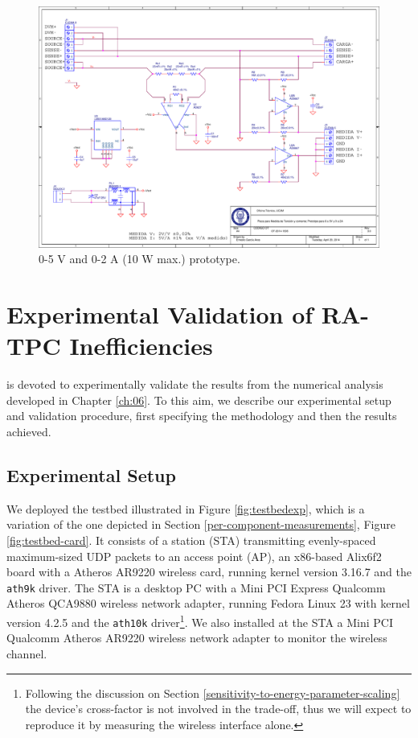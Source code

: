 \documentclass[twoside,nohyper]{tufte-book}
\newcommand{\restorewidth}{
  \restoregeometry
  \fancyhfoffset[RO]{{\marginparsep+\marginparwidth}}
}
\theoremstyle{definition}
\theoremstyle{definition}
\theoremstyle{definition}
\theoremstyle{remark}
\begin{document}
\begin{figure}

{\centering \includegraphics{img/03/schematic-v3} 

}

\caption[0-5 V and 0-2 A (10 W max.) prototype.]{0-5 V and 0-2 A (10 W max.) prototype.}\label{fig:schematicv3}
\end{figure}

\restorewidth

\chapter{Experimental Validation of RA-TPC
Inefficiencies}\label{experimental-validation-of-ra-tpc-inefficiencies}

 is devoted to experimentally validate the
results from the numerical analysis developed in Chapter \ref{ch:06}. To
this aim, we describe our experimental setup and validation procedure,
first specifying the methodology and then the results achieved.

\section{Experimental Setup}\label{experimental-setup}

We deployed the testbed illustrated in Figure \ref{fig:testbedexp},
which is a variation of the one depicted in Section
\ref{per-component-measurements}, Figure \ref{fig:testbed-card}. It
consists of a station (STA) transmitting evenly-spaced maximum-sized UDP
packets to an access point (AP), an x86-based Alix6f2 board with a
Atheros AR9220 wireless card, running kernel version 3.16.7 and the
\texttt{ath9k} driver. The STA is a desktop PC with a Mini PCI Express
Qualcomm Atheros QCA9880 wireless network adapter, running Fedora Linux
23 with kernel version 4.2.5 and the \texttt{ath10k} driver\footnote{Following
  the discussion on Section
  \ref{sensitivity-to-energy-parameter-scaling} the device's
  cross-factor is not involved in the trade-off, thus we will expect to
  reproduce it by measuring the wireless interface alone.}. We also
installed at the STA a Mini PCI Qualcomm Atheros AR9220 wireless network
adapter to monitor the wireless channel.
\end{document}
